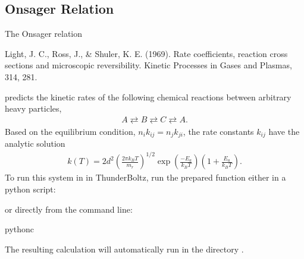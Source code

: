 \documentclass[letterpaper,10pt,english,openany,oneside]{sphinxmanual}
\begin{document}
\subsection{Onsager Relation}
\label{\detokenize{bm:onsager-relation}}
\sphinxAtStartPar
The Onsager relation %
\begin{footnote}[1]\sphinxAtStartFootnote
Light, J. C., Ross, J., \& Shuler, K. E. (1969). Rate coefficients,
reaction cross sections and microscopic reversibility. Kinetic
Processes in Gases and Plasmas, 314, 281.
%
\end{footnote} predicts the kinetic rates of the following
chemical reactions between arbitrary heavy particles,
\begin{equation*}
\begin{split}A \rightleftarrows B \rightleftarrows C \rightleftarrows A.\end{split}
\end{equation*}
\sphinxAtStartPar
Based on the equilibrium condition, \(n_i k_{ij}=n_jk_{ji}\),
the rate constants \(k_{ij}\) have the analytic solution
\begin{equation*}
\begin{split}k(T)= 2d^2\left(\frac{2\pi k_B T}{m_r}\right)^{1/2}
\exp\left(
    \frac{-E_a}{k_B T}\right)\left(1+\frac{E_a}{k_B T}
\right).\end{split}
\end{equation*}
\sphinxAtStartPar
To run this system in in ThunderBoltz, run the prepared function either
in a python script:

\begin{sphinxVerbatim}[commandchars=\\\{\}]
 
\end{sphinxVerbatim}

\sphinxAtStartPar
or directly from the command line:

\begin{sphinxVerbatim}[commandchars=\\\{\}]
python\PYGZhy{}c
\end{sphinxVerbatim}

\sphinxAtStartPar
The resulting calculation will automatically run in the
directory .
\end{document}
